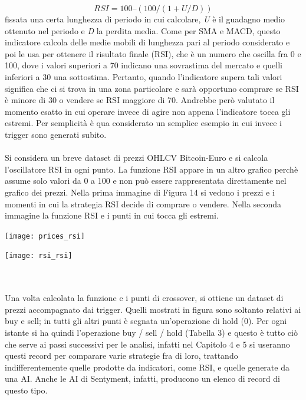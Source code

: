 \documentclass[a4paper,12pt]{report}
\begin{document}
\begin{equation}
	RSI = 100 – (100 / (1 + U/D))
\end{equation}
fissata una certa lunghezza di periodo in cui calcolare, \textit{U} è il guadagno medio ottenuto nel periodo e \textit{D} la perdita media. Come per SMA e MACD, questo indicatore calcola delle medie mobili di lunghezza pari al periodo considerato e poi le usa per ottenere il risultato finale (RSI), che è un numero che oscilla fra 0 e 100, dove i valori superiori a 70 indicano una sovrastima del mercato e quelli inferiori a 30 una sottostima. Pertanto, quando l'indicatore supera tali valori significa che ci si trova in una zona particolare e sarà opportuno comprare se RSI è minore di 30 o vendere se RSI maggiore di 70. Andrebbe però valutato il momento esatto in cui operare invece di agire non appena l'indicatore tocca gli estremi. Per semplicità è qua considerato un semplice esempio in cui invece i trigger sono generati subito.\\~\\
Si considera un breve dataset di prezzi OHLCV Bitcoin-Euro e si calcola l'oscillatore RSI in ogni punto. La funzione RSI appare in un altro grafico perchè assume solo valori da 0 a 100 e non può essere rappresentata direttamente nel grafico dei prezzi. Nella prima immagine di Figura 14 si vedono i prezzi e i momenti in cui la strategia RSI decide di comprare o vendere. Nella seconda immagine la funzione RSI e i punti in cui tocca gli estremi.\\
\begin{fig}
	\begin{center}
		\texttt{[image: prices\_rsi]}
	\end{center}
\end{fig}
\begin{fig}
	\begin{center}
		\texttt{[image: rsi\_rsi]}
	\end{center}
	\label{Figura 30}
\end{fig}
\\~\\Una volta calcolata la funzione e i punti di crossover, si ottiene un dataset di prezzi accompagnato dai trigger. Quelli mostrati in figura sono soltanto relativi ai buy e sell; in tutti gli altri punti è segnata un'operazione di hold (0). Per ogni istante si ha quindi l'operazione buy / sell / hold (Tabella 3) e questo è tutto ciò che serve ai passi successivi per le analisi, infatti nel Capitolo 4 e 5 si useranno questi record per comparare varie strategie fra di loro, trattando indifferentemente quelle prodotte da indicatori, come RSI, e quelle generate da una AI. Anche le AI di Sentyment, infatti, producono un elenco di record di questo tipo.\\
\end{document}
